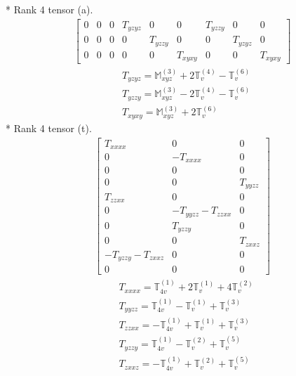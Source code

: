 \documentclass[fleqn,8pt,landscape]{jsarticle}
\begin{document}
* Rank 4 tensor (a).
\begin{align*}
\begin{bmatrix} 0 & 0 & 0 & T_{yzyz} & 0 & 0 & T_{yzzy} & 0 & 0 \\ 0 & 0 & 0 & 0 & T_{yzzy} & 0 & 0 & T_{yzyz} & 0 \\ 0 & 0 & 0 & 0 & 0 & T_{xyxy} & 0 & 0 & T_{xyxy} \end{bmatrix}
\end{align*}
\begin{align*}
& T_{yzyz} = \mathbb{M}_{xyz}^{(3)} + 2 \mathbb{T}_{v}^{(4)} - \mathbb{T}_{v}^{(6)} \\
& T_{yzzy} = \mathbb{M}_{xyz}^{(3)} - 2 \mathbb{T}_{v}^{(4)} - \mathbb{T}_{v}^{(6)} \\
& T_{xyxy} = \mathbb{M}_{xyz}^{(3)} + 2 \mathbb{T}_{v}^{(6)}
\end{align*}
* Rank 4 tensor (t).
\begin{align*}
\begin{bmatrix} T_{xxxx} & 0 & 0 \\ 0 & - T_{xxxx} & 0 \\ 0 & 0 & 0 \\ 0 & 0 & T_{yyzz} \\ T_{zzxx} & 0 & 0 \\ 0 & - T_{yyzz} - T_{zzxx} & 0 \\ 0 & T_{yzzy} & 0 \\ 0 & 0 & T_{zxxz} \\ - T_{yzzy} - T_{zxxz} & 0 & 0 \\ 0 & 0 & 0 \end{bmatrix}
\end{align*}
\begin{align*}
& T_{xxxx} = \mathbb{T}_{4v}^{(1)} + 2 \mathbb{T}_{v}^{(1)} + 4 \mathbb{T}_{v}^{(2)} \\
& T_{yyzz} = \mathbb{T}_{4v}^{(1)} - \mathbb{T}_{v}^{(1)} + \mathbb{T}_{v}^{(3)} \\
& T_{zzxx} = - \mathbb{T}_{4v}^{(1)} + \mathbb{T}_{v}^{(1)} + \mathbb{T}_{v}^{(3)} \\
& T_{yzzy} = \mathbb{T}_{4v}^{(1)} - \mathbb{T}_{v}^{(2)} + \mathbb{T}_{v}^{(5)} \\
& T_{zxxz} = - \mathbb{T}_{4v}^{(1)} + \mathbb{T}_{v}^{(2)} + \mathbb{T}_{v}^{(5)}
\end{align*}
\end{document}
